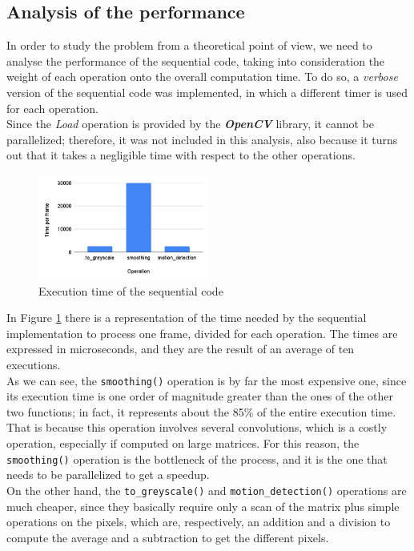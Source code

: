 \pagebreak

\subsection{Analysis of the performance}
In order to study the problem from a theoretical point of view, we need to analyse the performance of the sequential code, taking into consideration the weight of each operation onto the overall computation time. To do so, a \emph{verbose} version of the sequential code was implemented, in which a different timer is used for each operation.\\
Since the \emph{Load} operation is provided by the \textbf{\emph{OpenCV}} library, it cannot be parallelized; therefore, it was not included in this analysis, also because it turns out that it takes a negligible time with respect to the other operations. 

\begin{figure}
    \vspace{-6mm}
    \centering
    \includegraphics[width=0.5\textwidth]{img/seq_times_chart.png}
    \caption{Execution time of the sequential code}
    \label{fig:seq_times_chart}
\end{figure}

In Figure \ref{fig:seq_times_chart} there is a representation of the time needed by the sequential implementation to process one frame, divided for each operation. The times are expressed in  microseconds, and they are the result of an average of ten executions.\\
As we can see, the \texttt{smoothing()} operation is by far the most expensive one, since its execution time is one order of magnitude greater than the ones of the other two functions; in fact, it represents about the 85\% of the entire execution time. That is because this operation involves several convolutions, which is a costly operation, especially if computed on large matrices. For this reason, the \texttt{smoothing()} operation is the bottleneck of the process, and it is the one that needs to be parallelized to get a speedup.\\
On the other hand, the \texttt{to\_greyscale()} and \texttt{motion\_detection()} operations are much cheaper, since they basically require only a scan of the matrix plus simple operations on the pixels, which are, respectively, an addition and a division to compute the average and a subtraction to get the different pixels. 


